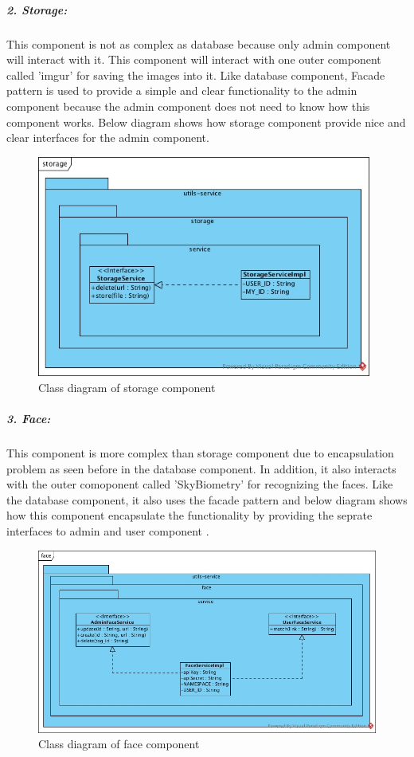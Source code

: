 \documentclass[a4paper,11pt]{article}
\begin{document}
\newpage
\subparagraph{2. Storage: }This component is not as complex as database because only admin component will interact with it. This component will interact with one outer component called 'imgur' for saving the images into it. Like database component, Facade pattern is used to provide a simple and clear functionality to the admin component because the admin component does not need to know how this component works. Below diagram shows how storage component provide nice and clear interfaces for the admin component.

\begin{figure}[ht!]
    \centering
	\includegraphics[width=110mm]{ClassDiagrams/new/storage.jpg}
	\caption{Class diagram of storage component}
\end{figure}

\subparagraph{3. Face: }This component is more complex than storage component due to encapsulation problem as seen before in the database component. In addition, it also interacts with the outer comoponent called 'SkyBiometry' for recognizing the faces. Like the database component, it also uses the facade pattern and below diagram shows how this component encapsulate the functionality by providing the seprate interfaces to admin and user component .

\begin{figure}[ht!]
    \centering
	\includegraphics[width=125mm]{ClassDiagrams/new/face.jpg}
	\caption{Class diagram of face component}
\end{figure}
\end{document}
